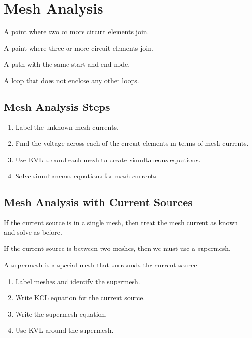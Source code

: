 \documentclass{article}
\begin{document}
\section{Mesh Analysis}
\begin{definition}[Node]
    A point where two or more circuit elements join.
\end{definition}
\begin{definition}
    A point where three or more circuit elements join.
\end{definition}
\begin{definition}[Loop]
    A path with the same start and end node.
\end{definition}
\begin{definition}[Mesh]
    A loop that does not enclose any other loops.
\end{definition}
\subsection{Mesh Analysis Steps}
\begin{enumerate}
    \item Label the unknown mesh currents.
    \item Find the voltage across each of the circuit elements in terms of mesh currents.
    \item Use KVL around each mesh to create simultaneous equations.
    \item Solve simultaneous equations for mesh currents.
\end{enumerate}
\subsection{Mesh Analysis with Current Sources}
If the current source is in a single mesh, then treat the mesh current as known and solve as before.

If the current source is between two meshes, then we must use a supermesh.
\begin{definition}[Supermesh]
    A supermesh is a special mesh that surrounds the current source.
\end{definition}
\begin{enumerate}
    \item Label meshes and identify the supermesh.
    \item Write KCL equation for the current source.
    \item Write the supermesh equation.
    \item Use KVL around the supermesh.
\end{enumerate}
\newpage
\end{document}
